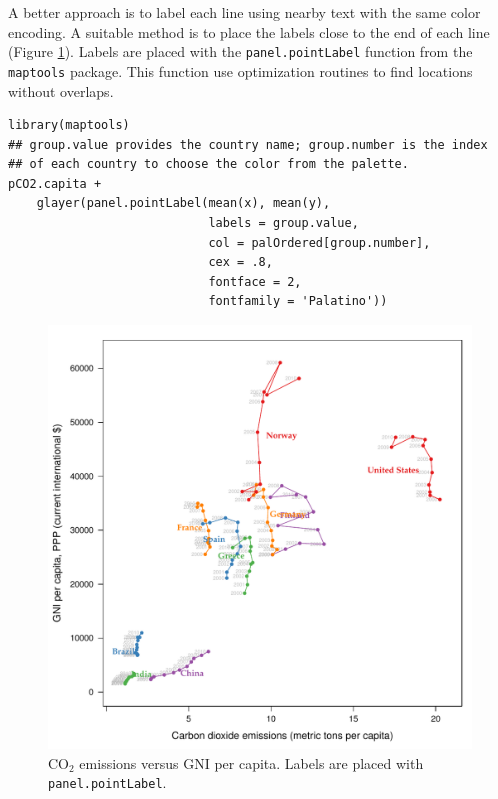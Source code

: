 A better approach is to label each line using nearby text with the
same color encoding. A suitable method is to place the labels
close to the end of each line (Figure
\ref{fig:CO2-GNI-glayer}). Labels are placed with the
\texttt{panel.pointLabel} function from the \texttt{maptools} package. This
function use optimization routines to find locations without
overlaps.


\lstset{language=r,label= ,caption= ,captionpos=b,numbers=none}
\begin{lstlisting}
library(maptools)  
## group.value provides the country name; group.number is the index
## of each country to choose the color from the palette.
pCO2.capita +
    glayer(panel.pointLabel(mean(x), mean(y),
                            labels = group.value,
                            col = palOrdered[group.number],
                            cex = .8,
                            fontface = 2,
                            fontfamily = 'Palatino'))
\end{lstlisting}

\begin{figure}[htbp]
\centering
\includegraphics[width=.9\linewidth]{figs/CO2_capita.pdf}
\caption{\(\mathrm{CO_2}\) emissions versus GNI per capita. Labels are placed with \texttt{panel.pointLabel}. \label{fig:CO2-GNI-glayer}}
\end{figure}

